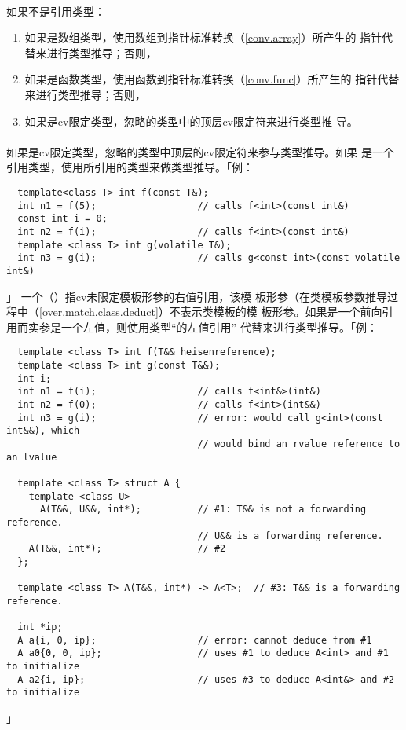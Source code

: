 \paragraph{}
如果不是引用类型：
\begin{enumerate}
  \item{如果是数组类型，使用数组到指针标准转换（\ref{conv.array}）所产生的
    指针代替来进行类型推导；否则，}
  \item{如果是函数类型，使用函数到指针标准转换（\ref{conv.func}）所产生的
    指针代替来进行类型推导；否则，}
  \item{如果是cv限定类型，忽略的类型中的顶层cv限定符来进行类型推
    导。}
\end{enumerate}

\paragraph{}
如果是cv限定类型，忽略的类型中顶层的cv限定符来参与类型推导。如果
是一个引用类型，使用所引用的类型来做类型推导。「例：
\begin{lstlisting}
  template<class T> int f(const T&);
  int n1 = f(5);                  // calls f<int>(const int&)
  const int i = 0;
  int n2 = f(i);                  // calls f<int>(const int&)
  template <class T> int g(volatile T&);
  int n3 = g(i);                  // calls g<const int>(const volatile int&)
\end{lstlisting}」
一个（）指cv未限定模板形参的右值引用，该模
板形参（在类模板参数推导过程中（\ref{over.match.class.deduct}）不表示类模板的模
板形参。如果是一个前向引用而实参是一个左值，则使用类型``的左值引用''
代替来进行类型推导。「例：
\begin{lstlisting}
  template <class T> int f(T&& heisenreference);
  template <class T> int g(const T&&);
  int i;
  int n1 = f(i);                  // calls f<int&>(int&)
  int n2 = f(0);                  // calls f<int>(int&&)
  int n3 = g(i);                  // error: would call g<int>(const int&&), which
                                  // would bind an rvalue reference to an lvalue

  template <class T> struct A {
    template <class U>
      A(T&&, U&&, int*);          // #1: T&& is not a forwarding reference.
                                  // U&& is a forwarding reference.
    A(T&&, int*);                 // #2
  };

  template <class T> A(T&&, int*) -> A<T>;  // #3: T&& is a forwarding reference.

  int *ip;
  A a{i, 0, ip};                  // error: cannot deduce from #1
  A a0{0, 0, ip};                 // uses #1 to deduce A<int> and #1 to initialize
  A a2{i, ip};                    // uses #3 to deduce A<int&> and #2 to initialize
\end{lstlisting}」

